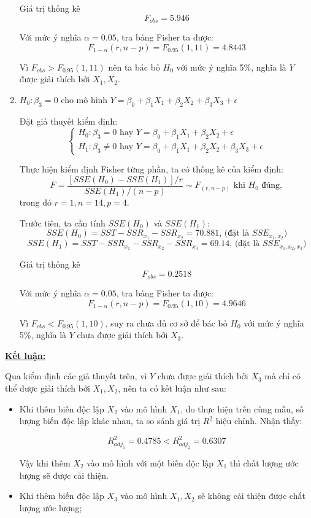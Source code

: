 \documentclass[a4paper]{article}
\theoremstyle{nonumberplain}
\begin{document}
\begin{enumerate}[label=(\roman*)]
	Giá trị thống kê $$F_{obs} = 5.946$$
	
	Với mức ý nghĩa $\alpha = 0.05$, tra bảng Fisher ta được:
	$$F_{1-\alpha}(r,n-p) = F_{0.95}(1,11) = 4.8443$$
	
	Vì $F_{obs}>F_{0.95}(1,11)$ nên ta bác bỏ $H_0$ với mức ý nghĩa 5\%, nghĩa là $Y$ được giải thích bởi $X_1,X_2$.
	
	\item $H_0: \beta_3 = 0$ cho mô hình $Y = \beta_0 + \beta_1X_1 + \beta_2X_2 + \beta_3X_3 + \epsilon$
	
	Đặt giả thuyết kiểm định:
	\[\begin{cases}
		H_0 : \beta_3 = 0 \text{ hay } Y = \beta_0 + \beta_1 X_1 + \beta_2 X_2 + \epsilon \\
		H_1 : \beta_3 \ne 0 \text{ hay } Y = \beta_0 + \beta_1 X_1 + \beta_2 X_2 + \beta_3 X_3 + \epsilon 
	\end{cases}\]

	Thực hiện kiểm định Fisher từng phần, ta có thống kê của kiểm định: 
	$$F = \displaystyle \frac{\left [ SSE (H_0) - SSE(H_1) \right ] / r}{SSE(H_1)/(n-p)} \sim F_{(r,n-p)} \text{ khi } H_0 \text{ đúng},$$
	trong đó $r = 1, n = 14, p = 4$.
	
	Trước tiên, ta cần tính $SSE (H_0)$ và $SSE(H_1)$:
	$$SSE(H_0) = SST - SSR_{x_1} - SSR_{x_2} = 70.881 \text{, (đặt là }  SSE_{x_1,x_2}) $$
	$$SSE(H_1) = SST - SSR_{x_1} - SSR_{x_2} - SSR_{x_3} = 69.14 \text{, (đặt là }  SSE_{x_1,x_2,x_3})$$
	
	Giá trị thống kê $$F_{obs} = 0.2518$$
	
	Với mức ý nghĩa $\alpha = 0.05$, tra bảng Fisher ta được:
	$$F_{1-\alpha}(r,n-p) = F_{0.95}(1,10) = 4.9646$$
	
	Vì $F_{obs}<F_{0.95}(1,10)$, suy ra chưa đủ cơ sở để bác bỏ $H_0$ với mức ý nghĩa 5\%, nghĩa là $Y$ chưa được giải thích bởi $X_3$.
\end{enumerate}

\textbf{\underline{Kết luận:}}

Qua kiểm định các giả thuyết trên, vì $Y$ chưa được giải thích bởi $X_3$ mà chỉ có thể được giải thích bởi $X_1, X_2$, nên ta có kết luận như sau:
\begin{itemize}
	\item Khi thêm biến độc lập $X_2$ vào mô hình $X_1$, do thực hiện trên cùng mẫu, số lượng biến độc lập khác nhau, ta so sánh giá trị $R^2$ hiệu chỉnh. Nhận thấy:
	
	\[R^2_{adj_1} = 0.4785 < R^2_{adj_2} = 0.6307\]
	
	Vậy khi thêm $X_2$ vào mô hình với một biến độc lập $X_1$ thì chất lượng ước lượng sẽ được cải thiện.
	
	\item Khi thêm biến độc lập $X_3$ vào mô hình $X_1,X_2$ sẽ không cải thiện được chất lượng ước lượng;
\end{itemize}
\end{document}
